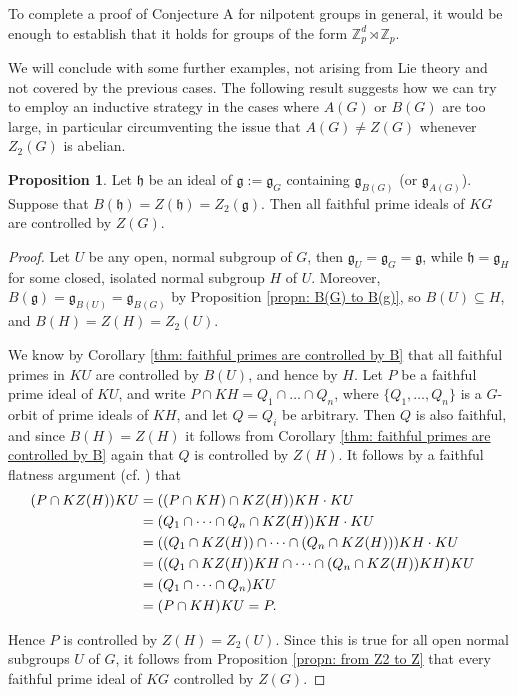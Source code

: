 \documentclass[12pt,a4paper]{article}
\let\\=\cr
\theoremstyle{definition}
\newtheorem{propn}[thm]{Proposition}
\theoremstyle{remark}
\theoremstyle{custthm}
\newcommand{\blue}[1]{\textcolor{blue!70!black}{\marginnote{\hspace{20pt}\dangertriangle}#1}}
\newcommand\dangertriangle{%
 \makebox[1.4em][c]{%
 \makebox[0pt][c]{\raisebox{.1em}{\small{\textbf{!}}}}%
 \makebox[0pt][c]{\Large$\bigtriangleup$}}}%
\begin{document}
To complete a proof of Conjecture A for nilpotent groups in general, it would be enough to establish that it holds for groups of the form $\mathbb{Z}_p^d\rtimes\mathbb{Z}_p$.\\

We will conclude with some further examples, not arising from Lie theory and not covered by the previous cases. The following result suggests how we can try to employ an inductive strategy in the cases where $A(G)$ or $B(G)$ are too large, in particular circumventing the issue that $A(G)\neq Z(G)$ whenever $Z_2(G)$ is abelian.

\begin{propn}\label{propn: new examples}
Let $\mathfrak{h}$ be an ideal of $\mathfrak{g}:=\mathfrak{g}_G$ containing $\mathfrak{g}_{B(G)}$ (or $\mathfrak{g}_{A(G)}$). Suppose that $B(\mathfrak{h})=Z(\mathfrak{h})=Z_2(\mathfrak{g})$. Then all faithful prime ideals of $KG$ are controlled by $Z(G)$.
\end{propn}

\begin{proof}

Let $U$ be any open, normal subgroup of $G$, then $\mathfrak{g}_U=\mathfrak{g}_G=\mathfrak{g}$, while $\mathfrak{h}=\mathfrak{g}_H$ for some closed, isolated normal subgroup $H$ of $U$. Moreover, $B(\mathfrak{g})=\mathfrak{g}_{B(U)}=\mathfrak{g}_{B(G)}$ by Proposition \ref{propn: B(G) to B(g)}, so $B(U)\subseteq H$, and $B(H)=Z(H)=Z_2(U)$.

We know by Corollary \ref{thm: faithful primes are controlled by B} that all faithful primes in $KU$ are controlled by $B(U)$, and hence by $H$. Let $P$ be a faithful prime ideal of $KU$, and write $P\cap KH = Q_1 \cap \dots \cap Q_n$, where $\{Q_1, \dots, Q_n\}$ is a $G$-orbit of prime ideals of $KH$, and let $Q = Q_i$ be arbitrary. Then $Q$ is also faithful, and since $B(H) = Z(H)$ it follows from Corollary \ref{thm: faithful primes are controlled by B} again that $Q$ is controlled by $Z(H)$. It follows by a faithful flatness argument (cf. \cite[Lemma 5.1]{ardakovInv}) that
\begin{align*}
(P\cap KZ(H))KU &= ((P\cap KH)\cap KZ(H))KH\cdot KU\\
&= (Q_1 \cap \dots \cap Q_n \cap KZ(H))KH\cdot KU\\
&= ((Q_1 \cap KZ(H)) \cap \dots \cap (Q_n \cap KZ(H)))KH\cdot KU\\
&= ((Q_1 \cap KZ(H))KH \cap \dots \cap (Q_n \cap KZ(H))KH)KU\\
&= (Q_1 \cap \dots \cap Q_n)KU\\
&= (P\cap KH)KU = P.
\end{align*}

Hence $P$ is controlled by $Z(H)=Z_2(U)$. Since this is true for all open normal subgroups $U$ of $G$, it follows from Proposition \ref{propn: from Z2 to Z} that every faithful prime ideal of $KG$ controlled by $Z(G)$.\end{proof}
\end{document}
